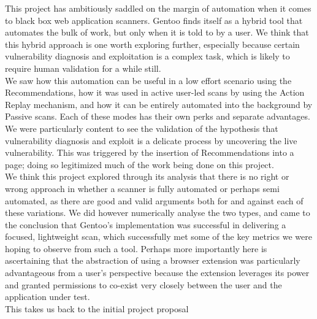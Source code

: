 This project has ambitiously saddled on the margin of automation when it comes to black box web application scanners. Gentoo finds itself as a hybrid tool that automates the bulk of work, but only when it is told to by a user. We think that this hybrid approach is one worth exploring further, especially because certain vulnerability diagnosis and exploitation is a complex task, which is likely to require human validation for a while still. \\

We saw how this automation can be useful in a low effort scenario using the Recommendations, how it was used in active user-led scans by using the Action Replay mechanism, and how it can be entirely automated into the background by Passive scans. Each of these modes has their own perks and separate advantages. We were particularly content to see the validation of the hypothesis that vulnerability diagnosis and exploit is a delicate process by uncovering the live vulnerability. This was triggered by the insertion of Recommendations into a page; doing so legitimized much of the work being done on this project. \\

We think this project explored through its analysis that there is no right or wrong approach in whether a scanner is fully automated or perhaps semi automated, as there are good and valid arguments both for and against each of these variations. We did however numerically analyse the two types, and came to the conclusion that Gentoo's implementation was successful in delivering a focused, lightweight scan, which successfully met some of the key metrics we were hoping to observe from such a tool. Perhaps more importantly here is ascertaining that the abstraction of using a browser extension was particularly advantageous from a user's perspective because the extension leverages its power and granted permissions to co-exist very closely between the user and the application under test. \\

 This takes us back to the initial project proposal 
 




































